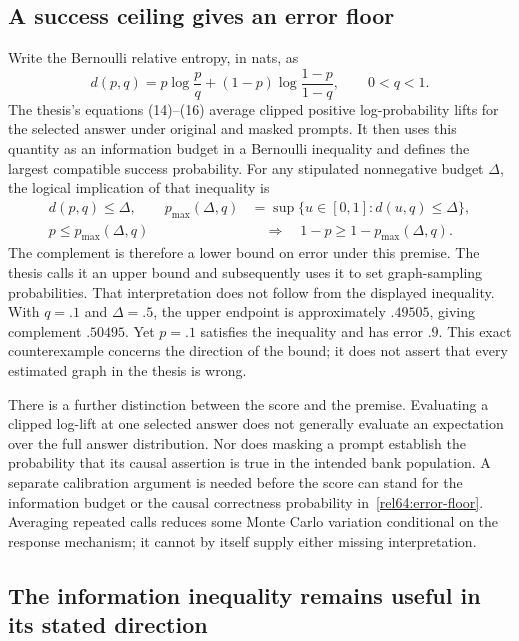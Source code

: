 \subsection{A success ceiling gives an error floor}

Write the Bernoulli relative entropy, in nats, as
\[
 d(p,q)=p\log\frac pq+(1-p)\log\frac{1-p}{1-q},
 \qquad 0<q<1.
\]
The thesis's equations (14)--(16) average clipped positive log-probability
lifts for the selected answer under original and masked prompts. It then uses
this quantity as an information budget in a Bernoulli inequality and defines
the largest compatible success probability. For any stipulated nonnegative
budget $\Delta$, the logical implication of that inequality is
\begin{equation}
 \begin{split}
 d(p,q)\leq\Delta,\qquad
 p_{\max}(\Delta,q)&=\sup\{u\in[0,1]:d(u,q)\leq\Delta\},\\
 p\leq p_{\max}(\Delta,q)&\quad\Longrightarrow\quad
 1-p\geq1-p_{\max}(\Delta,q).
 \end{split}
 \label{rel64:error-floor}
\end{equation}
The complement is therefore a lower bound on error under this premise. The
thesis calls it an upper bound and subsequently uses it to set graph-sampling
probabilities. That interpretation does not follow from the displayed
inequality. With $q=.1$ and $\Delta=.5$, the upper endpoint is approximately
$.49505$, giving complement $.50495$. Yet $p=.1$ satisfies the inequality
and has error $.9$. This exact counterexample concerns the direction of the
bound; it does not assert that every estimated graph in the thesis is wrong.
\citep{rel64molero}

There is a further distinction between the score and the premise. Evaluating
a clipped log-lift at one selected answer does not generally evaluate an
expectation over the full answer distribution. Nor does masking a prompt
establish the probability that its causal assertion is true in the intended
bank population. A separate calibration argument is needed before the score
can stand for the information budget or the causal correctness probability
in~\eqref{rel64:error-floor}. Averaging repeated calls reduces some
Monte Carlo variation conditional on the response mechanism; it cannot by
itself supply either missing interpretation.

\subsection{The information inequality remains useful in its stated direction}

